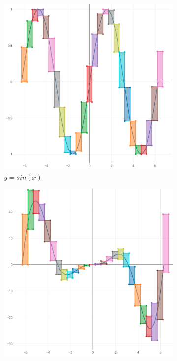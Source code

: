 \documentclass[12pt,a4paper]{article}
\begin{document}
    \begin{figure}[H]
        \centering
        \begin{subfigure}[h]{0.3\textwidth}
            \centering
            \includegraphics[scale=0.1]{sinx.png}
            \caption{$y = sin(x)$}
            \label{fig:sinx}
        \end{subfigure}
        \begin{subfigure}[h]{0.3\textwidth}
            \centering
            \includegraphics[scale=0.1]{sinx_sqrx.png}

\end{subfigure}
\end{figure}
\end{document}
